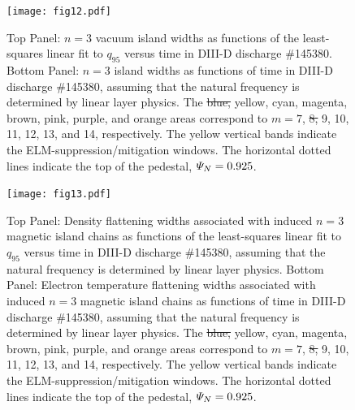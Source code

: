 \documentclass[12pt,prb,aps]{revtex4-1}
\providecommand{\DIFadd}[1]{{\protect\color{blue}\uwave{#1}}} %
\providecommand{\DIFdel}[1]{{\protect\color{red}\sout{#1}}}                      %
\providecommand{\DIFaddFL}[1]{\DIFadd{#1}} %
\providecommand{\DIFdelFL}[1]{\DIFdel{#1}} %
\providecommand{\DIFaddbeginFL}{} %
\providecommand{\DIFaddendFL}{} %
\providecommand{\DIFdelbeginFL}{} %
\providecommand{\DIFdelendFL}{} %
\begin{document}
\begin{figure}
\DIFdelbeginFL %
\DIFdelendFL \DIFaddbeginFL \texttt{[image: fig12.pdf]}
\DIFaddendFL \caption{Top Panel: $n=3$ vacuum island widths as functions of the least-squares linear fit to $q_{95}$ versus time
in   DIII-D discharge \#145380.
Bottom Panel:  $n=3$ island widths as functions of time
in   DIII-D discharge \#145380, assuming that the natural frequency is determined by linear layer physics. The \DIFdelbeginFL \DIFdelFL{blue, }\DIFdelendFL yellow, cyan, magenta, brown, pink,
purple, and orange  areas correspond to \DIFdelbeginFL \DIFdelFL{$m=7$}\DIFdelendFL \DIFaddbeginFL \DIFaddFL{$m=8$}\DIFaddendFL ,  \DIFdelbeginFL \DIFdelFL{8, }\DIFdelendFL 9, 10, 11, 12, 13, and 14, respectively. The yellow vertical bands indicate the ELM-suppression/mitigation windows. 
The horizontal dotted lines indicate the top of the pedestal, ${\mit\Psi}_N=0.925$.} \label{fig12}
\end{figure}

\begin{figure}
\DIFdelbeginFL %
\DIFdelendFL \DIFaddbeginFL \texttt{[image: fig13.pdf]}
\DIFaddendFL \caption{Top Panel: Density flattening widths associated with induced $n=3$ magnetic island  chains as functions of the least-squares linear fit to $q_{95}$ versus time
in   DIII-D discharge \#145380, assuming that the natural frequency is determined by linear layer physics.
Bottom Panel:  Electron temperature flattening widths associated with induced $n=3$ magnetic island chains as functions of time
in   DIII-D discharge \#145380, assuming that the natural frequency is determined by linear layer physics. The \DIFdelbeginFL \DIFdelFL{blue, }\DIFdelendFL yellow, cyan, magenta, brown, pink,
purple, and orange  areas correspond to \DIFdelbeginFL \DIFdelFL{$m=7$}\DIFdelendFL \DIFaddbeginFL \DIFaddFL{$m=8$}\DIFaddendFL , \DIFdelbeginFL \DIFdelFL{8, }\DIFdelendFL 9, 10, 11, 12, 13, and 14, respectively. The yellow vertical bands indicate the ELM-suppression/mitigation windows. 
The horizontal dotted lines indicate  the top of the pedestal, ${\mit\Psi}_N=0.925$.} \label{fig13}
\end{figure}
\end{document}
